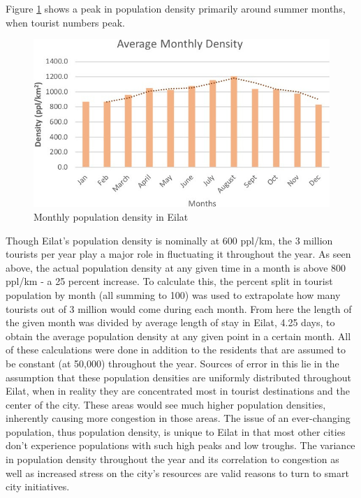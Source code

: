 \documentclass[12pt]{article}                               %
\begin{document}
Figure \ref{img:monthly_population_density} shows a peak in population density primarily around summer months, when tourist numbers peak.

\begin{figure}[H]
    \centering
    \includegraphics[width=1\columnwidth]{images/monthly_population_density.jpg}
    \caption{Monthly population density in Eilat}
    \label{img:monthly_population_density}
\end{figure}

Though Eilat's population density is nominally at 600 ppl/km, the 3 million tourists per year play a major role in fluctuating it throughout the year. As seen above, the actual population density at any given time in a month is above 800 ppl/km - a 25 percent increase. To calculate this, the percent split in tourist population by month (all summing to 100) was used to extrapolate how many tourists out of 3 million would come during each month. From here the length of the given month was divided by average length of stay in Eilat, 4.25 days, to obtain the average population density at any given point in a certain month. All of these calculations were done in addition to the residents that are assumed to be constant (at 50,000) throughout the year. Sources of error in this lie in the assumption that these population densities are uniformly distributed throughout Eilat, when in reality they are concentrated most in tourist destinations and the center of the city. These areas would see much higher population densities, inherently causing more congestion in those areas. The issue of an ever-changing population, thus population density, is unique to Eilat in that most other cities don't experience populations with such high peaks and low troughs. The variance in population density throughout the year and its correlation to congestion as well as increased stress on the city's resources are valid reasons to turn to smart city initiatives.
\end{document}
